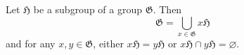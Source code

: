 Let $\mathfrak{H}$ be a subgroup of a group $\mathfrak{G}$. Then
\[
\mathfrak{G} = \bigcup_{x \in \mathfrak{G}} x\mathfrak{H}
\]
and for any $x, y \in \mathfrak{G}$, either $x\mathfrak{H} = y\mathfrak{H}$ or $x\mathfrak{H} \cap y\mathfrak{H} = \varnothing$.
